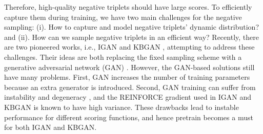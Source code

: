 \documentclass[conference]{IEEEtran}
\begin{document}
Therefore,
high-quality negative triplets should have large scores.
To efficiently capture them during training,
we have two main challenges for the negative sampling:
(i). How to capture and model negative triplets' dynamic distribution? 
and (ii). How can we sample negative triplets in an efficient way?
Recently,
there are two pioneered works, 
i.e.,
IGAN \cite{wang2018incorporating} and KBGAN \cite{cai2018kbgan},
attempting to address these challenges.
Their ideas are both replacing the fixed sampling scheme with
a generative adversarial network (GAN) \cite{goodfellow2014generative}.
{However,
the GAN-based solutions still have many problems.
		First, GAN increases the number of training parameters because an extra generator is introduced.
		Second,
		GAN training can suffer from instability and degeneracy \cite{arjovsky2017wasserstein, gulrajani2017improved}, 
		and the REINFORCE gradient \cite{williams1992simple} used in IGAN and KBGAN is known to have high variance.
		These drawbacks lead to instable performance for different scoring functions, 
and hence pretrain becomes a must for both IGAN and KBGAN.}
\end{document}
